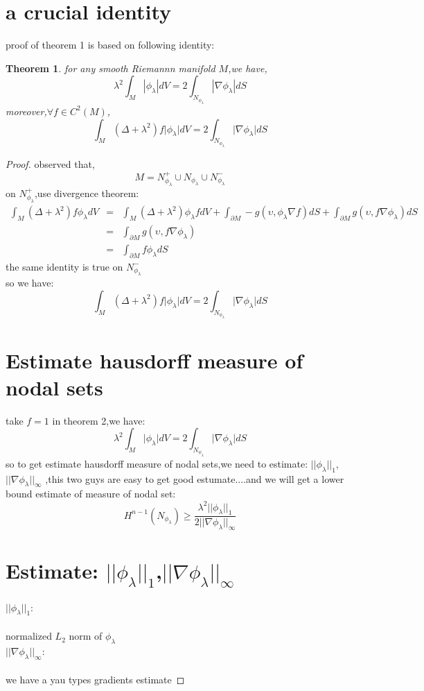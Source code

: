 \documentclass[11pt]{article}
\newtheorem{theorem}{Theorem}
\newtheorem{proof}{proof}
\begin{document}
\section{a crucial identity}
proof of theorem 1 is based on following identity:\\
\begin{theorem}
for any smooth Riemannn manifold $M$,we have,
	\[ \lambda^2\int_{M}|\phi_{\lambda}|dV = 2\int_{N_{\phi_{\lambda}}} |\nabla\phi_{\lambda}|dS\]
	moreover,$\forall f \in C^2(M)$,
	\[\int_M(\Delta+\lambda^2)f \vert\phi_{\lambda}\vert dV=2\int_{N_{\phi_{\lambda}}} \vert\nabla\phi_{\lambda}\vert dS\]
	\end{theorem}
	\begin{proof}
	observed that,
\[M=N_{\phi_{\lambda}}^+ \cup N_{\phi_{\lambda}} \cup N_{\phi_{\lambda}}^-\]
on $N_{\phi_{\lambda}}^+$,use divergence theorem:\\
\begin{eqnarray*}
	\int_M(\Delta+\lambda^2)f \phi_{\lambda} dV&=&\int_M(\Delta+\lambda^2)\phi_{\lambda}f dV+\int_{\partial M}	-g(\upsilon,\phi_{\lambda}\nabla f)dS+\int_{\partial M} g(\upsilon,f\nabla\phi_{\lambda})dS\\
	&=&\int_{\partial M} g(\upsilon,f\nabla\phi_{\lambda})	\\
	&=&\int_{\partial M} f\phi_{\lambda}dS
\end{eqnarray*}
the same identity is true on $N_{\phi_{\lambda}}^-$\\
so we have:\\
\[\int_M(\Delta+\lambda^2)f \vert\phi_{\lambda}\vert dV=2\int_{N_{\phi_{\lambda}}} \vert\nabla\phi_{\lambda}\vert dS\]

\section{Estimate hausdorff measure of nodal sets}
take $f=1$ in theorem 2,we have:\\
\[\lambda^2\int_M\vert\phi_{\lambda}\vert dV=2\int_{N_{\phi_{\lambda}}} \vert\nabla\phi_{\lambda}\vert dS\]
so to get estimate hausdorff measure of nodal sets,we need to estimate:
$||\phi_{\lambda}||_1$,$||\nabla\phi_{\lambda}||_{\infty}$ ,this two guys are easy to get good estumate....and we will get a lower bound estimate of measure of nodal set:
\[H^{n-1}(N_{\phi_{\lambda}}) \geq \frac{\lambda^2||\phi_{\lambda}||_1}{2||\nabla\phi_{\lambda}||_{\infty}}\]


\section{Estimate:
$||\phi_{\lambda}||_1$,$||\nabla\phi_{\lambda}||_{\infty}$}
$||\phi_{\lambda}||_1$:\\
\\
normalized $L_2$ norm of $\phi_{\lambda}$
\\
$||\nabla\phi_{\lambda}||_{\infty}$:\\
\\
we have a yau types gradients estimate


\end{proof}
\end{document}
